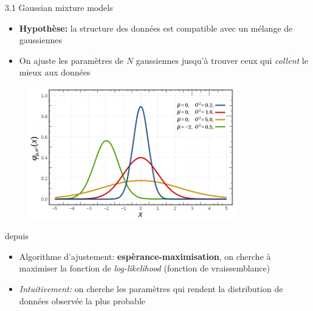 \begin{frame}{3.1 Gaussian mixture models}
  \begin{itemize}
  \item \textbf{Hypothèse:} la structure des données est compatible avec un mélange de gaussiennes
  \end{itemize}
  \begin{minipage}{0.48\textwidth}
    \begin{itemize}
    \item On ajuste les paramètres de $N$ gaussiennes jusqu'à trouver ceux qui \textit{collent} le mieux aux données
    \end{itemize}
  \end{minipage}
  \begin{minipage}{0.48\textwidth}
    \begin{figure}
      \includegraphics[width=0.8\textwidth]{figs/gaussianFct.png}
    \end{figure}
    \tiny
    \vspace{-0.5cm}
    \begin{center}
      depuis \href{https://en.wikipedia.org/wiki/Gaussian_function}{\color{blue}{Wikipedia}}
    \end{center}
  \end{minipage}
  \begin{itemize}
  \item Algorithme d'ajustement: \textbf{espèrance-maximisation}, on cherche à maximiser la fonction de \textit{log-likelihood} (fonction de vraissemblance)
  \item \textit{Intuitivement:} on cherche les paramètres qui rendent la distribution de données observée la plus probable
  \end{itemize}
\end{frame}

